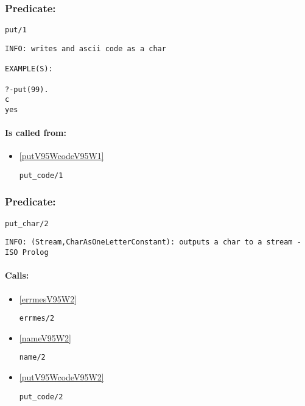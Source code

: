 \subsubsection{Predicate:} \label{putV95W1}

\begin{verbatim}
put/1
\end{verbatim}

{\small \begin{verbatim}
INFO: writes and ascii code as a char

EXAMPLE(S):

?-put(99).
c
yes

\end{verbatim}}
\paragraph{Is called from:} 
\begin{itemize}
\item \ref{putV95WcodeV95W1} 
\begin{verbatim}
put_code/1
\end{verbatim}

\end{itemize}

\subsubsection{Predicate:} \label{putV95WcharV95W2}

\begin{verbatim}
put_char/2
\end{verbatim}

{\small \begin{verbatim}
INFO: (Stream,CharAsOneLetterConstant): outputs a char to a stream -ISO Prolog

\end{verbatim}}
\paragraph{Calls:} 
\begin{itemize}
\item \ref{errmesV95W2} 
\begin{verbatim}
errmes/2
\end{verbatim}

\item \ref{nameV95W2} 
\begin{verbatim}
name/2
\end{verbatim}

\item \ref{putV95WcodeV95W2} 
\begin{verbatim}
put_code/2
\end{verbatim}

\end{itemize}

